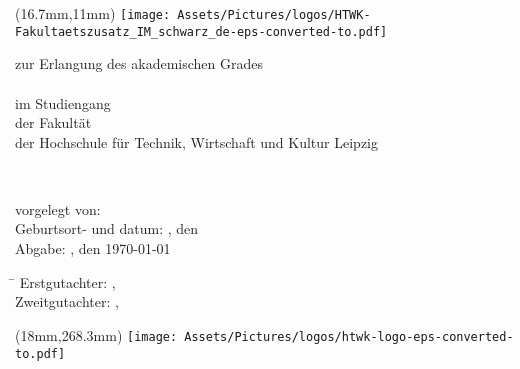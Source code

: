 

\begin{titlepage}
	\noindent
\begin{textblock*}{4.74cm}(16.7mm,11mm)
\texttt{[image: Assets/Pictures/logos/HTWK-Fakultaetszusatz\_IM\_schwarz\_de-eps-converted-to.pdf]}
\end{textblock*}
\begin{center}

\vspace*{0.5cm}

\large
{\textsc{\Large \abschlussarbeit}}

\vspace*{0.5cm}
zur Erlangung des akademischen Grades\\[0.6cm]
\studienganggrad\\[0.6cm]
im Studiengang \studiengang\\
der Fakultät \\
der Hochschule für Technik, Wirtschaft und Kultur Leipzig

\vspace*{0.8cm}
{\LARGE \textbf{\titel}}\\
\vspace*{0.3cm}
{\Large \textbf{\subtitel}}

\end{center}


\vspace*{1.5cm}
vorgelegt von: \autor \\
Geburtsort- und datum: \geburtsort, den \geburtstag \\
Abgabe: \ort, den \today



\vspace*{1cm}
\large
\begin{tabbing}
\hspace{4cm}\=\kill
Erstgutachter:  \> \erstgutachter, \instituteErstgutachter\\ 
Zweitgutachter: \> \zweitgutachter, \instituteZweitgutachter
\end{tabbing} 

\begin{textblock*}{8.41cm}(18mm,268.3mm)
\texttt{[image: Assets/Pictures/logos/htwk-logo-eps-converted-to.pdf]}
\end{textblock*}

\end{titlepage}
